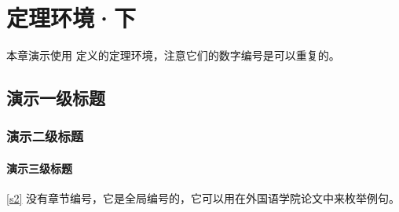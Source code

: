 \chapter{定理环境·下}

本章演示使用  定义的定理环境，注意它们的数字编号是可以重复的。

\section{演示一级标题}
\subsection{演示二级标题}
\subsubsection{演示三级标题}



\autoref{s2} 没有章节编号，它是全局编号的，它可以用在外国语学院论文中来枚举例句。
